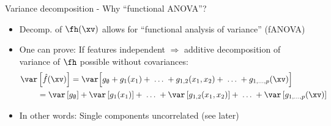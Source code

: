 \documentclass[10pt,compress,t,notes=noshow, xcolor=table]{beamer}
\newcommand{\open}{}
\newcommand{\close}{}
\begin{document}
\begin{framev}[align=top]{Variance decomposition - Why ``functional ANOVA''?
}
\begin{itemize}[<+->]
\item Decomp. of $\fh(\xv)$ allows for ``functional analysis of variance'' (fANOVA)
\item One can prove: 
If features independent $\Rightarrow$ additive decomposition of variance of $\fh$ possible without covariances:
\begin{align*}
\var & \left[ \hat{f}(\xv) \right]
=  \var \Big[g_{\open \emptyset \close} + g_{\open 1 \close}(x_1) + \;\dots\; + g_{\open 1, 2 \close}(x_1, x_2) + \;\dots\; + g_{\open 1,\ldots,p \close}(\xv) \Big] \\
& = \var\left[g_{\open \emptyset \close}\right]
+ \var\left[g_{\open 1 \close}(x_1)\right] + \;\dots\;
+ \var\left[g_{\open 1, 2 \close}(x_1, x_2)\right] + \;\dots\;
+ \var\left[g_{\open 1,\ldots,p \close}(\xv)\right]
\end{align*}
\item In other words: Single components uncorrelated (see later)

\end{itemize}
\end{framev}
\end{document}
